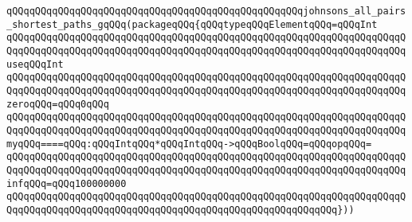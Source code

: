 \verb|qQQqqQQqqQQqqQQqqQQqqQQqqQQqqQQqqQQqqQQqqQQqqQQqqQQqjohnsons_all_pairs_shortest_paths_gqQQq(packageqQQq{qQQqtypeqQQqElementqQQq=qQQqInt|\newline
\verb|qQQqqQQqqQQqqQQqqQQqqQQqqQQqqQQqqQQqqQQqqQQqqQQqqQQqqQQqqQQqqQQqqQQqqQQqqQQqqQQqqQQqqQQqqQQqqQQqqQQqqQQqqQQqqQQqqQQqqQQqqQQqqQQqqQQqqQQqqQQquseqQQqInt|\newline
\verb|qQQqqQQqqQQqqQQqqQQqqQQqqQQqqQQqqQQqqQQqqQQqqQQqqQQqqQQqqQQqqQQqqQQqqQQqqQQqqQQqqQQqqQQqqQQqqQQqqQQqqQQqqQQqqQQqqQQqqQQqqQQqqQQqqQQqqQQqqQQqzeroqQQq=qQQq0qQQq|\newline
\verb|qQQqqQQqqQQqqQQqqQQqqQQqqQQqqQQqqQQqqQQqqQQqqQQqqQQqqQQqqQQqqQQqqQQqqQQqqQQqqQQqqQQqqQQqqQQqqQQqqQQqqQQqqQQqqQQqqQQqqQQqqQQqqQQqqQQqqQQqqQQqmyqQQq====qQQq:qQQqIntqQQq*qQQqIntqQQq->qQQqBoolqQQq=qQQqopqQQq=|\newline
\verb|qQQqqQQqqQQqqQQqqQQqqQQqqQQqqQQqqQQqqQQqqQQqqQQqqQQqqQQqqQQqqQQqqQQqqQQqqQQqqQQqqQQqqQQqqQQqqQQqqQQqqQQqqQQqqQQqqQQqqQQqqQQqqQQqqQQqqQQqqQQqinfqQQq=qQQq100000000|\newline
\verb|qQQqqQQqqQQqqQQqqQQqqQQqqQQqqQQqqQQqqQQqqQQqqQQqqQQqqQQqqQQqqQQqqQQqqQQqqQQqqQQqqQQqqQQqqQQqqQQqqQQqqQQqqQQqqQQqqQQqqQQqqQQqqQQq}))|\newline

